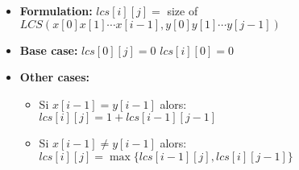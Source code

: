 \begin{itemize}
 \item \textbf{Formulation:}
$lcs[i][j] =$ size of \\\text{\ \ \ } $LCS(x[0] x[1] \cdots x[i - 1], y[0] y[1] \cdots y[j - 1])$
  \item \textbf{Base case:} $
lcs[0][j]  = 0$ \hspace{15pt} 
$lcs[i][0]  = 0$
  \item \textbf{Other cases: }
  \begin{itemize}
  \item Si $x[i-1] = y[i-1]$ alors: \\
  \quad $lcs[i][j] = 1 + lcs[i-1][j-1]$ 
  \item Si $x[i-1] \neq y[i-1]$ alors: \\
  \quad $lcs[i][j] = \max \{lcs[i-1][j], lcs[i][j-1]\}$
  \end{itemize}
\end{itemize}